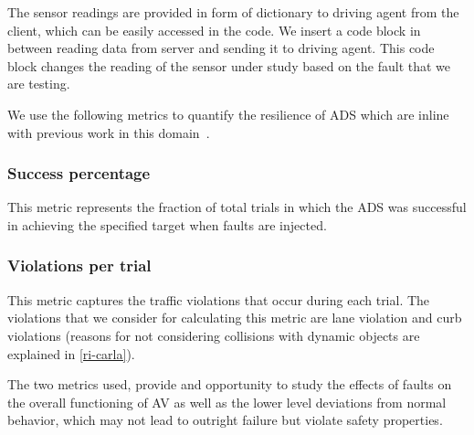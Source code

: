 The sensor readings are provided in form of dictionary to driving agent from the client, which can be easily accessed in the code. We insert a code block in between reading data from server and sending it to driving agent. This code block changes the reading of the sensor under study based on the fault that we are testing.

We use the following metrics to quantify the resilience of ADS which are inline with previous work in this domain~\cite{avfi}.
\setcounter{subsubsection}{0}

\medskip
\subsubsection{Success percentage} This metric represents the fraction of total trials in which the ADS was successful in achieving the specified target when faults are injected.

\smallskip

\subsubsection{Violations per trial} This metric captures the traffic violations that occur during each trial. The violations that we consider for calculating this metric are lane violation and curb violations (reasons for not considering collisions with dynamic objects are explained in \ref{ri-carla}). 

The two metrics used, provide and opportunity to study the effects of faults on the overall functioning of AV as well as the lower level deviations from normal behavior, which may not lead to outright failure but violate safety properties. 


